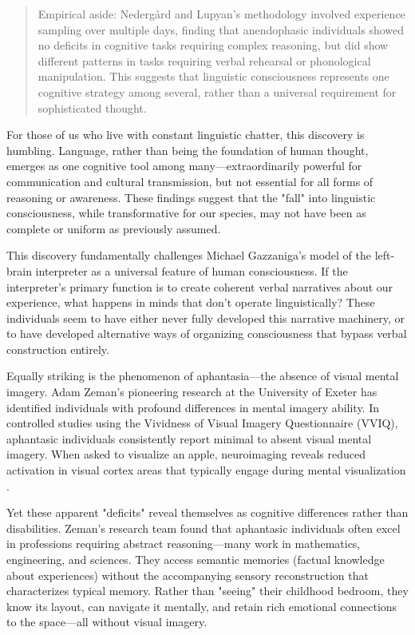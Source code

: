 \begin{quote}\small
Empirical aside: Nedergård and Lupyan's methodology involved experience sampling over multiple days, finding that anendophasic individuals showed no deficits in cognitive tasks requiring complex reasoning, but did show different patterns in tasks requiring verbal rehearsal or phonological manipulation. This suggests that linguistic consciousness represents one cognitive strategy among several, rather than a universal requirement for sophisticated thought.
\end{quote}

For those of us who live with constant linguistic chatter, this discovery is humbling. Language, rather than being the foundation of human thought, emerges as one cognitive tool among many—extraordinarily powerful for communication and cultural transmission, but not essential for all forms of reasoning or awareness. These findings suggest that the "fall" into linguistic consciousness, while transformative for our species, may not have been as complete or uniform as previously assumed.

This discovery fundamentally challenges Michael Gazzaniga's model of the left-brain interpreter as a universal feature of human consciousness. If the interpreter's primary function is to create coherent verbal narratives about our experience, what happens in minds that don't operate linguistically? These individuals seem to have either never fully developed this narrative machinery, or to have developed alternative ways of organizing consciousness that bypass verbal construction entirely.

Equally striking is the phenomenon of aphantasia—the absence of visual mental imagery. Adam Zeman's pioneering research at the University of Exeter has identified individuals with profound differences in mental imagery ability. In controlled studies using the Vividness of Visual Imagery Questionnaire (VVIQ), aphantasic individuals consistently report minimal to absent visual mental imagery. When asked to visualize an apple, neuroimaging reveals reduced activation in visual cortex areas that typically engage during mental visualization \parencite{zeman2015aphantasia}.

Yet these apparent "deficits" reveal themselves as cognitive differences rather than disabilities. Zeman's research team found that aphantasic individuals often excel in professions requiring abstract reasoning—many work in mathematics, engineering, and sciences. They access semantic memories (factual knowledge about experiences) without the accompanying sensory reconstruction that characterizes typical memory. Rather than "seeing" their childhood bedroom, they know its layout, can navigate it mentally, and retain rich emotional connections to the space—all without visual imagery.

